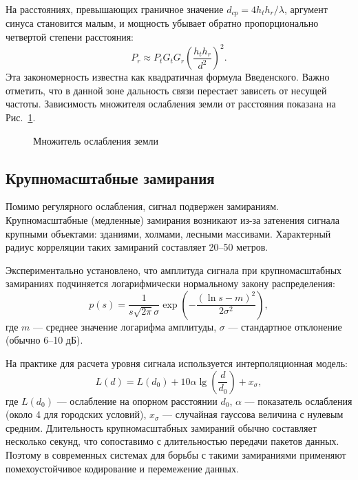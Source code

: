 На расстояниях, превышающих граничное значение $d_{cp} = 4 h_t h_r / \lambda$, аргумент синуса становится малым, и мощность убывает обратно пропорционально четвертой степени расстояния:
\begin{equation}
    P_r \approx P_t G_t G_r \left(\frac{h_t h_r}{d^2}\right)^2.
\end{equation}
Эта закономерность известна как квадратичная формула Введенского. Важно отметить, что в данной зоне дальность связи перестает зависеть от несущей частоты. Зависимость множителя ослабления земли от расстояния показана на Рис.~\ref{fig:two_ray}.

\begin{figure}[htbp]
    \centering
    \caption{Множитель ослабления земли}
    \label{fig:two_ray}
\end{figure}

\subsection{Крупномасштабные замирания}

Помимо регулярного ослабления, сигнал подвержен замираниям. Крупномасштабные (медленные) замирания возникают из-за затенения сигнала крупными объектами: зданиями, холмами, лесными массивами. Характерный радиус корреляции таких замираний составляет 20--50 метров.

Экспериментально установлено, что амплитуда сигнала при крупномасштабных замираниях подчиняется логарифмически нормальному закону распределения:
\begin{equation}
    p(s) = \frac{1}{s\sqrt{2\pi}\sigma} \exp\left(-\frac{(\ln s - m)^2}{2\sigma^2}\right),
\end{equation}
где $m$ --- среднее значение логарифма амплитуды, $\sigma$ --- стандартное отклонение (обычно 6--10 дБ).

На практике для расчета уровня сигнала используется интерполяционная модель:
\begin{equation}
    L(d) = L(d_0) + 10\alpha \lg\left(\frac{d}{d_0}\right) + x_\sigma,
\end{equation}
где $L(d_0)$ --- ослабление на опорном расстоянии $d_0$, $\alpha$ --- показатель ослабления (около 4 для городских условий), $x_\sigma$ --- случайная гауссова величина с нулевым средним. Длительность крупномасштабных замираний обычно составляет несколько секунд, что сопоставимо с длительностью передачи пакетов данных. Поэтому в современных системах для борьбы с такими замираниями применяют помехоустойчивое кодирование и перемежение данных.

